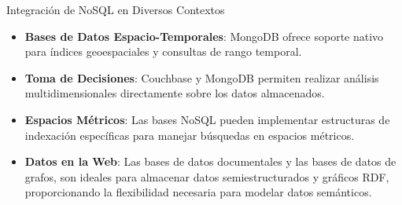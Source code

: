\begin{frame}{Integración de NoSQL en Diversos Contextos}

\begin{itemize}
    \item \textbf{Bases de Datos Espacio-Temporales}: MongoDB ofrece soporte nativo para índices geoespaciales y consultas de rango temporal. 

        
    \item \textbf{Toma de Decisiones}:  Couchbase y MongoDB permiten realizar análisis multidimensionales directamente sobre los datos almacenados. 
    
        
    \item \textbf{Espacios Métricos}: Las bases NoSQL pueden implementar estructuras de indexación específicas para manejar búsquedas en espacios métricos.

        
    \item \textbf{Datos en la Web}: Las bases de datos documentales y las bases de datos de grafos, son ideales para almacenar datos semiestructurados y gráficos RDF, proporcionando la flexibilidad necesaria para modelar datos semánticos. 
    
\end{itemize}
    
\end{frame}